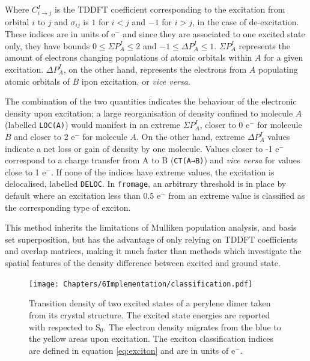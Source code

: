 Where $C^I_{i\rightarrow{}j}$ is the TDDFT coefficient corresponding to the excitation from orbital $i$ to $j$ and $\sigma_{ij}$ is $1$ for $i<j$ and $-1$ for $i>j$, in the case of de-excitation. These indices are in units of $\mathrm{e^-}$ and since they are associated to one excited state only, they have bounds $0 \leq \Sigma P^I_A \leq 2$ and $-1 \leq \Delta P^I_A \leq 1$. $\Sigma P^I_A$ represents the amount of electrons changing populations of atomic orbitals within $A$ for a given excitation. $\Delta P^I_A$, on the other hand, represents the electrons from $A$ populating atomic orbitals of $B$ ipon excitation, or \textit{vice versa}.

The combination of the two quantities indicates the behaviour of the electronic density upon excitation; a large reorganisation of density confined to molecule $A$ (labelled \texttt{LOC(A)}) would manifest in an extreme $\Sigma P^I_A$, closer to 0 $\mathrm{e^-}$  for molecule $B$ and closer to 2 $\mathrm{e^-}$  for molecule $A$. On the other hand, extreme $\Delta P^I_A$ values indicate a net loss or gain of density by one molecule. Values closer to -1 $\mathrm{e^-}$ correspond to a charge transfer from A to B (\texttt{CT(A→B)}) and \textit{vice versa} for values close to 1 $\mathrm{e^-}$. If none of the indices have extreme values, the excitation is delocalised, labelled \texttt{DELOC}. In \texttt{fromage}, an arbitrary threshold is in place by default where an excitation less than 0.5 $\mathrm{e^-}$ from an extreme value is classified as the corresponding type of exciton.

This method inherits the limitations of Mulliken population analysis, and basis set superposition, but has the advantage of only relying on TDDFT coefficients and overlap matrices, making it much faster than methods which investigate the spatial features of the density difference between excited and ground state.

\begin{figure}[ht]
\centering
  \texttt{[image: Chapters/6Implementation/classification.pdf]}
  \caption{Transition density of two excited states of a perylene dimer taken from its crystal structure. The excited state energies are reported with respected to S$_0$. The electron density migrates from the blue to the yellow areas upon excitation. The exciton classification indices are defined in equation \ref{eq:exciton} and are in units of $\mathrm{e^-}$.}
  \label{fig:classification}
\end{figure}

